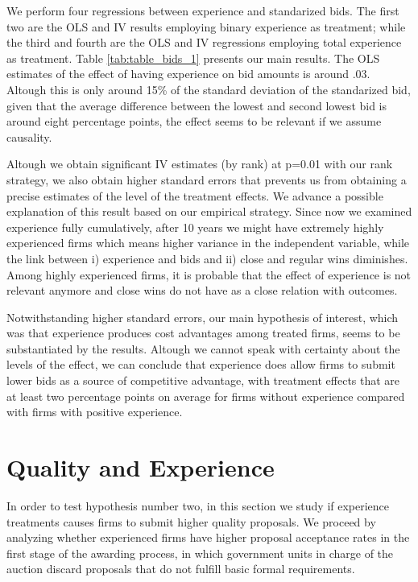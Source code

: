 We perform four regressions between experience and standarized bids. The first two are the OLS and IV results employing binary experience as treatment; while the third and fourth are the OLS and IV regressions employing total experience as treatment. Table \ref{tab:table_bids_1} presents our main results. The OLS estimates of the effect of having experience on bid amounts is around .03. Altough this is only around 15\% of the standard deviation of the standarized bid, given that the average difference between the lowest and second lowest bid is around eight percentage points, the effect seems to be relevant if we assume causality.

Altough we obtain significant IV estimates (by rank) at p=0.01 with our rank strategy, we also obtain higher standard errors that prevents us from obtaining a precise estimates of the level of the treatment effects. We advance a possible explanation of this result based on our empirical strategy. Since now we examined experience fully cumulatively, after 10 years we might have extremely highly experienced firms which means higher variance in the independent variable, while the link between i) experience and bids and ii) close and regular wins diminishes. Among highly experienced firms, it is probable that the effect of experience is not relevant anymore and close wins do not have as a close relation with outcomes.



Notwithstanding higher standard errors, our main hypothesis of interest, which was that experience produces cost advantages among treated firms, seems to be substantiated by the results. Altough we cannot speak with certainty about the levels of the effect, we can conclude that experience does allow firms to submit lower bids as a source of competitive advantage, with treatment effects that are at least two percentage points on average for firms without experience compared with firms with positive experience.


\section{Quality and Experience}
\label{section:qualityexp}
In order to test hypothesis number two, in this section we study if experience treatments causes firms to submit higher quality proposals. We proceed by analyzing whether experienced firms have higher proposal acceptance rates in the first stage of the awarding process, in which government units in charge of the auction discard proposals that do not fulfill basic formal requirements.

